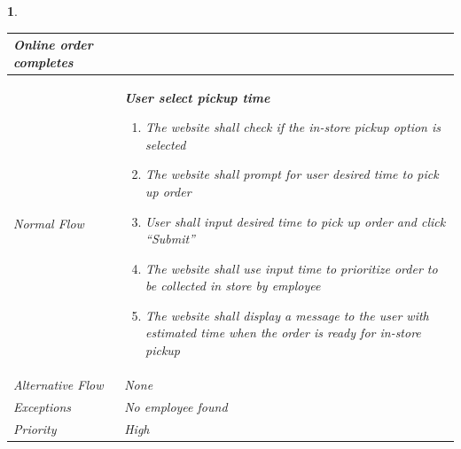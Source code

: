 \documentclass{scrreprt}
\theoremstyle{funreq}
\newtheorem{funreq}{}
\begin{document}
\begin{funreq}
\begin{table}[H]
{\begin{tabularx}{\columnwidth}{|l|X|}
					Online order completes
					\\ \hline Normal Flow &
					\bfseries{User select pickup time}\normalfont\newline 
					\begin{enumerate}
					    \item The website shall check if the in-store pickup option is selected
					    \item The website shall prompt for user desired time to pick up order
                        \item User shall input desired time to pick up order and click “Submit”
                        \item The website shall use input time to prioritize order to be collected in store by employee
                        \item The website shall display a message to the user with estimated time when the order is ready for in-store pickup
					\end{enumerate}
					\\ \hline Alternative Flow & 
					None
					\\ \hline Exceptions & 
					No employee found
					\\ \hline Priority & 
					High
					\\ \hline
				\end{tabularx}%
			}
		\end{table}
	\end{funreq}


\end{document}
